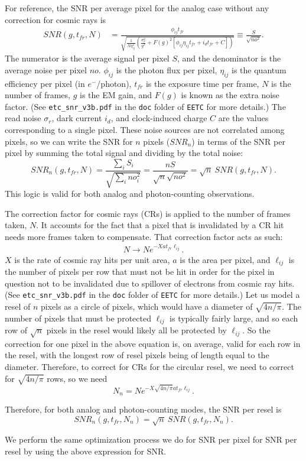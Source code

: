 \documentclass{article}
\begin{document}
For reference, the SNR per average pixel for the analog case without any correction for cosmic rays is
\begin{align}
    SNR(g, t_{fr}, N) &=  \frac{\phi_{ij} t_{fr}}{\sqrt{\frac{1}{N \eta_{ij}^2} \left(\frac{\sigma_{r}^2}{g^2} + F(g)^2  \left[\phi_{ij} \eta_{ij} t_{fr} + i_{d} t_{fr} + C\right]\right)}} \equiv \frac{S}{\sqrt{no^2}}.
\end{align}
The numerator is the average signal per pixel $S$, and the denominator is the average noise per pixel $no$.  $\phi_{ij}$ is the photon flux per pixel, $\eta_{ij}$ is the quantum efficiency per pixel (in $e^-$/photon), $t_{fr}$ is the exposure time per frame, $N$ is the number of frames,
$g$ is the EM gain, and $F(g)$ is known as the extra noise factor.  (See {\tt etc\_snr\_v3b.pdf} in the {\tt doc} folder of {\tt EETC} for more details.)
The read noise $\sigma_r$, dark current $i_d$, and clock-induced charge $C$ are the values corresponding to a single pixel.  These noise sources are not correlated among pixels, so we can write the SNR for $n$ pixels ($SNR_{n}$) in terms of the SNR per pixel by summing the total signal and dividing by the total noise:
\begin{equation}
SNR_n(g, t_{fr}, N) = \frac{ \sum_i S_i}{\sqrt{ \sum_i no_i^2}} = \frac{n S}{ \sqrt{n} \sqrt{no^2}} = \sqrt{n} ~ SNR(g,t_{fr}, N).
\end{equation}
This logic is valid for both analog and photon-counting observations.


The correction factor for cosmic rays (CRs) is applied to the number of frames taken, $N$.  It accounts for the fact that a pixel that is invalidated by a CR hit needs more frames taken to compensate.  That correction factor acts as such:
\begin{align}
    N \rightarrow N e^{-X a t_{fr} \ell_{ij}}.
\end{align}
$X$ is the rate of cosmic ray hits per unit area, $a$ is the area per pixel, and $\ell_{ij}$ is the number of pixels per row that must not be hit in order for the pixel in question not to be invalidated due to spillover of electrons from cosmic ray hits.
(See {\tt etc\_snr\_v3b.pdf} in the {\tt doc} folder of {\tt EETC} for more details.)  Let us model a resel of $n$ pixels as a circle of pixels, which would have a diameter of $\sqrt{4 n/\pi}$.  The number of pixels that must be protected $\ell_{ij}$ is typically fairly large, and
so each row of $\sqrt{n}$ pixels in the resel would likely all be protected by $\ell_{ij}$.  So the correction for one pixel in the above equation is, on average, valid for each row in the resel, with the longest row of resel pixels being of length equal to the diameter.  Therefore, to correct for CRs for the circular resel, we need to correct for $\sqrt{4 n/\pi}$ rows, so we need
\begin{equation}
    N_n = N e^{-X \sqrt{4 n/\pi} a t_{fr} \ell_{ij}}.
\end{equation}

Therefore, for both analog and photon-counting modes, the SNR per resel is
\begin{equation}
SNR_n(g,t_{fr},N_n) = \sqrt{n} ~ SNR(g,t_{fr}, N_n).
\end{equation}

We perform the same optimization process we do for SNR per pixel for SNR per resel by using the above expression for SNR.
\end{document}
